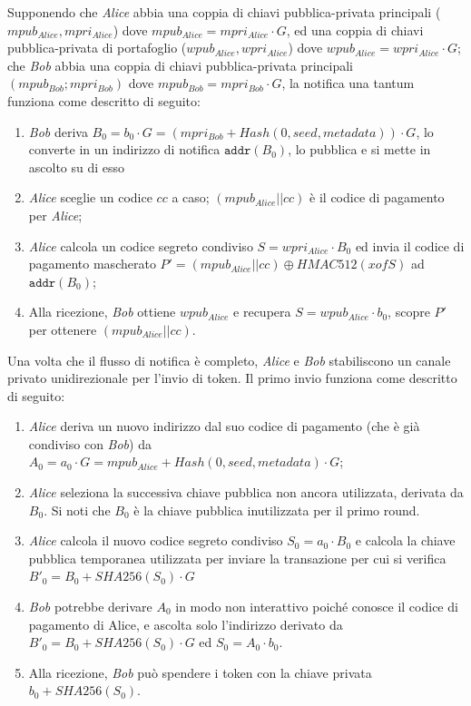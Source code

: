 Supponendo che \emph{Alice} abbia una coppia di chiavi pubblica-privata principali ($mpub_{Alice}, mpri_{Alice}$) dove $mpub_{Alice} = mpri_{Alice}\cdot G$, ed una coppia di chiavi pubblica-privata di portafoglio ($wpub_{Alice}, wpri_{Alice}$) dove $wpub_{Alice} = wpri_{Alice}\cdot G$; che \emph{Bob} abbia una coppia di chiavi pubblica-privata principali $(mpub_{Bob}; mpri_{Bob})$ dove $mpub_{Bob} = mpri_{Bob}\cdot G$, la notifica una tantum funziona come descritto di seguito:

\begin{enumerate}
	\item \emph{Bob} deriva $B_0 = b_0\cdot G = (mpri_{Bob} + Hash(0, seed, metadata))\cdot G$, lo converte in un indirizzo di notifica $\texttt{addr}(B_0)$, lo pubblica e si mette in ascolto su di esso

	\item  \emph{Alice} sceglie un codice $cc$ a caso; $(mpub_{Alice}||cc)$ è il codice di pagamento per \emph{Alice};

	\item  \emph{Alice} calcola un codice segreto condiviso $S = wpri_{Alice}\cdot B_0$ ed invia il codice di  pagamento mascherato $P' = (mpub_{Alice}||cc)\oplus HMAC512(xofS)$ ad $\texttt{addr}(B_0)$;

	\item Alla ricezione, \emph{Bob} ottiene $wpub_{Alice}$ e recupera $S = wpub_{Alice}\cdot b_0$, scopre $P'$ per ottenere $(mpub_{Alice}||cc)$.
\end{enumerate}

Una volta che il flusso di notifica è completo, \emph{Alice} e \emph{Bob} stabiliscono un canale privato unidirezionale per l'invio di token. Il primo invio funziona come descritto di seguito:

\begin{enumerate}
	\item \emph{Alice} deriva un nuovo indirizzo dal suo codice di pagamento (che è già condiviso con \emph{Bob}) da $A_0 = a_0\cdot G = mpub_{Alice} + Hash(0, seed, metadata)\cdot G$;

	\item \emph{Alice} seleziona la successiva chiave pubblica non ancora utilizzata, derivata da $B_0$. Si noti che $B_0$ è la chiave pubblica inutilizzata per il primo round.

	\item \emph{Alice} calcola il nuovo codice segreto condiviso $S_0 = a_0\cdot B_0$ e calcola la chiave pubblica temporanea utilizzata per inviare la transazione per cui si verifica $B'_0 = B_0 + SHA256(S_0)\cdot G$

	\item \emph{Bob} potrebbe derivare $A_0$ in modo non interattivo poiché conosce il codice di pagamento di Alice, e ascolta solo l'indirizzo derivato da $B'_0 = B_0 + SHA256(S_0)\cdot G$ ed $S_0 = A_0\cdot b_0$.

	\item Alla ricezione, \emph{Bob} può spendere i token con la chiave privata $b_0 + SHA256(S_0)$.

\end{enumerate}

